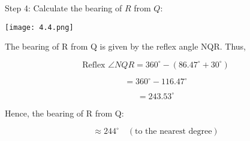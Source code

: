 \begin{flushleft}
	Step 4: Calculate the bearing of $R$ from $Q$:
	\\
	\begin{center}
		\texttt{[image: 4.4.png]}
	\end{center}
	The bearing of R from Q is given by the reflex angle NQR. Thus,
	
	\[
	\text{Reflex } \angle NQR = 360^\circ - (86.47^\circ + 30^\circ)
	\]
	
	\[
	= 360^\circ - 116.47^\circ
	\]
	
	\[
	= 243.53^\circ
	\]
	
	Hence, the bearing of R from Q:
	
	\[
	\approx 244^\circ \quad (\text{to the nearest degree})
	\]
	
	
\end{flushleft}
